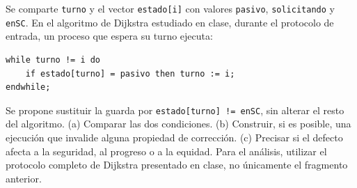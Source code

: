 \documentclass[11pt,a4paper,oneside]{report}
\begin{document}
\begin{ejercicio}
Se comparte \texttt{turno} y el vector \texttt{estado[i]} con valores \texttt{pasivo}, \texttt{solicitando} y
\texttt{enSC}. En el algoritmo de Dijkstra estudiado en clase, durante el protocolo de entrada, un proceso que
espera su turno ejecuta:
\begin{lstlisting}
while turno != i do
    if estado[turno] = pasivo then turno := i;
endwhile;
\end{lstlisting}
Se propone sustituir la guarda por \texttt{estado[turno] != enSC}, sin alterar el resto del algoritmo. (a) Comparar
las dos condiciones. (b) Construir, si es posible, una ejecución que invalide alguna propiedad de corrección. (c)
Precisar si el defecto afecta a la seguridad, al progreso o a la equidad. Para el análisis, utilizar el protocolo
completo de Dijkstra presentado en clase, no únicamente el fragmento anterior.
\end{ejercicio}
\end{document}
